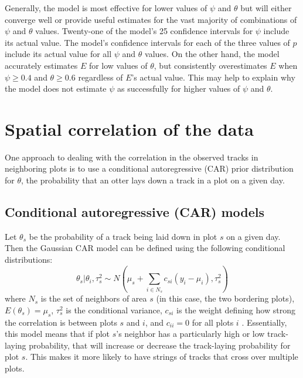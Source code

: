 \documentclass[12pt]{article}
\begin{document}
    Generally, the model is most effective for lower values of \(\psi\) and
    \(\theta\) but will either converge well or provide useful estimates for the
    vast majority of combinations of \(\psi\) and \(\theta\) values. Twenty-one
    of the
    model's 25 confidence intervals for \(\psi\) include its actual value.
    The model's confidence intervals for each of the
    three values of \(p\) include its actual value for all \(\psi\) and
    \(\theta\) values. On the other hand, the model accurately estimates \(E\)
    for low values of \(\theta\), but consistently overestimates \(E\) when
    \(\psi\geq0.4\) and \(\theta\geq0.6\) regardless of \(E\)'s actual value.
    This may help to explain why the model does not estimate \(\psi\) as
    successfully for higher values of \(\psi\) and \(\theta\).

\section{Spatial correlation of the data}
One approach to dealing with the correlation in the
observed tracks in neighboring plots is to use a conditional autoregressive
(CAR) prior distribution for $\theta$, the probability that an otter lays down a
track in a plot on a given day.

    \subsection{Conditional autoregressive (CAR) models}
    Let $\theta_s$ be the probability of a track being laid down in plot $s$ on
    a given day. Then the Gaussian CAR model can be defined using the following
    conditional distributions:
    \begin{equation}
        \theta_s|\theta_i,\tau_s^2 \sim N(\mu_s+\sum_{i\in N_s}
        c_{si}(y_i-\mu_i),\tau_s^2)
    \end{equation}
    where $N_s$ is the set of neighbors of area $s$ (in this case, the two
    bordering plots), $E(\theta_s)=\mu_s$, $\tau_s^2$ is the conditional
    variance, $c_{si}$ is the weight defining how strong the correlation is
    between plots $s$ and $i$, and $c_{ii}=0$ for all plots $i$ \cite{Arab2008}.
    Essentially, this model means that if plot $s$'s neighbor has a
    particularly high or low track-laying probability, that will increase or
    decrease the track-laying probability for plot $s$. This makes it more
    likely to have strings of tracks that cross over multiple plots.
\end{document}
